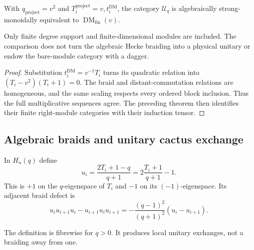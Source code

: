 \begin{theorem}
{\normalfont\statusProved}\quad With
$q_{\mathrm{project}}=v^2$ and
$T_i^{\mathrm{project}}=v,t_i^{\mathrm{DM}}$, the category $\mathcal U_q$
is algebraically strong-monoidally equivalent to
$\operatorname{DM}_{\mathrm{fin}}(v)$.
\end{theorem}
\begin{scope}
Only finite degree support and finite-dimensional modules are included.  The
comparison does not turn the algebraic Hecke braiding into a physical unitary
or endow the bare-module category with a dagger.
\end{scope}
\begin{proof}
Substitution $t_i^{\mathrm{DM}}=v^{-1}T_i$ turns its quadratic relation into
$(T_i-v^2)(T_i+1)=0$.  The braid and distant-commutation relations are
homogeneous, and the same scaling respects every ordered block inclusion.
Thus the full multiplicative sequences agree.  The preceding theorem then
identifies their finite right-module categories with their induction tensor.
\end{proof}

\subsection{Algebraic braids and unitary cactus exchange}

\begin{definition}
In $H_n(q)$ define
\[
 u_i=\frac{2T_i+1-q}{q+1}
     =2\frac{T_i+1}{q+1}-1.
\]
This is $+1$ on the $q$-eigenspace of $T_i$ and $-1$ on its
$(-1)$-eigenspace.  Its adjacent braid defect is
\[
 u_i u_{i+1}u_i-u_{i+1}u_i u_{i+1}
 =-\frac{(q-1)^2}{(q+1)^2}(u_i-u_{i+1}).
\]
\end{definition}
\begin{scope}
The definition is fibrewise for $q>0$.  It produces local unitary exchanges,
not a braiding away from one.
\end{scope}


